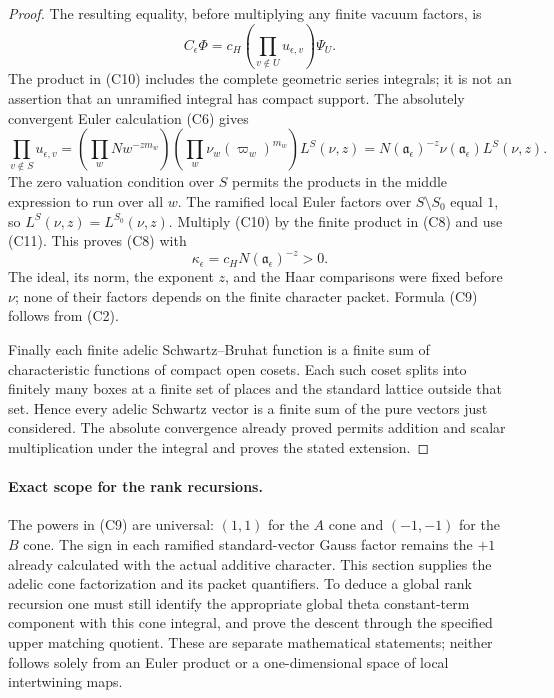 \begin{proof}
The resulting equality, before multiplying any finite vacuum factors,
is
\[
 C_\epsilon\Phi
      =c_H\left(\prod_{v\notin U}u_{\epsilon,v}\right)\Psi_U.
 \tag{C10}\label{eq:sr-cone-before-euler}
\]
The product in (C10) includes the complete geometric series integrals;
it is not an assertion that an unramified integral has compact support.
The absolutely convergent Euler calculation (C6) gives
\[
 \prod_{v\notin S}u_{\epsilon,v}
   =\left(\prod_wNw^{-zm_w}\right)
        \left(\prod_w\nu_w(\varpi_w)^{m_w}\right)
                         L^S(\nu,z)
   =N(\mathfrak a_\epsilon)^{-z}
             \nu(\mathfrak a_\epsilon)L^S(\nu,z).
 \tag{C11}\label{eq:sr-cone-complete-euler}
\]
The zero valuation condition over \(S\) permits the products in the
middle expression to run over all \(w\). The ramified local Euler
factors over \(S\setminus S_0\) equal \(1\), so
\(L^S(\nu,z)=L^{S_0}(\nu,z)\).
Multiply (C10) by the finite product in (C8) and use (C11). This proves
(C8) with
\[
 \kappa_\epsilon=c_H N(\mathfrak a_\epsilon)^{-z}>0.
\]
The ideal, its norm, the exponent \(z\), and the Haar comparisons were
fixed before \(\nu\); none of their factors depends on the finite
character packet. Formula (C9) follows from (C2).

Finally each finite adelic Schwartz--Bruhat function is a finite sum of
characteristic functions of compact open cosets. Each such coset
splits into finitely many boxes at a finite set of places and the
standard lattice outside that set. Hence every adelic Schwartz vector
is a finite sum of the pure vectors just considered. The absolute
convergence already proved permits addition and scalar multiplication
under the integral and proves the stated extension.
\end{proof}

\paragraph{Exact scope for the rank recursions.}
\label{rem:sr-cone-euler-scope}
The powers in (C9) are universal: \((1,1)\) for the \(A\) cone and
\((-1,-1)\) for the \(B\) cone. The sign in each ramified standard-vector
Gauss factor remains the \(+1\) already calculated with the actual
additive character. This section supplies the adelic cone factorization
and its packet quantifiers. To deduce a global rank recursion one must
still identify the appropriate global theta constant-term component
with this cone integral, and prove the descent through the specified
upper matching quotient. These are separate mathematical statements;
neither follows solely from an Euler product or a one-dimensional
space of local intertwining maps.

